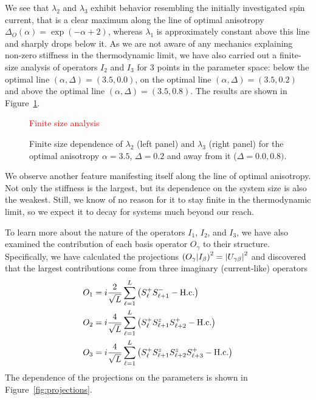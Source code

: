 We see that \(\lambda_2\) and \(\lambda_3\) exhibit behavior resembling the initially investigated spin current,
that is a clear maximum along the line of optimal anisotropy \(\Delta_{O}(\alpha) = \exp(-\alpha + 2)\),
whereas \(\lambda_1\) is approximately constant above this line and sharply drops below it.
As we are not aware of any mechanics explaining non-zero stiffness in the thermodynamic limit, we
have also carried out a finite-size analysis of operators \(I_2\) and \(I_3\) for 3 points in the parameter space:
below the optimal line \((\alpha,\Delta) = (3.5,0.0)\), on the optimal line \((\alpha,\Delta) = (3.5,0.2)\) and
above the optimal line \((\alpha,\Delta) = (3.5,0.8)\). The results are shown in Figure~\ref{fig:stiffness_finite_size}.


\begin{figure}[htbp]
  \centering
  \textcolor{red}{Finite size analysis}
  \caption{Finite size dependence of \(\lambda_2\) (left panel) and \(\lambda_3\) (right panel) for the
  optimal anisotropy \(\alpha = 3.5\), \(\Delta = 0.2\) and away from it (\(\Delta = 0.0,0.8)\).}
  \label{fig:stiffness_finite_size}
\end{figure}
We observe another feature manifesting itself along the line of optimal anisotropy. Not only
the stiffness is the largest, but its dependence on the system size is also the weakest. Still,
we know of no reason for it to stay finite in the thermodynamic limit, so we expect it to
decay for systems much beyond our reach.

To learn more about the nature of the operators \(I_1\), \(I_2\), and \(I_3\), we have also
examined the contribution of each basis operator \(O_{\gamma}\) to their structure. Specifically,
we have calculated the projections \(\left(O_{\gamma} \middle| I_{\beta}\right)^2 = \abs{U_{\gamma\beta}}^2\)
and discovered that the largest contributions come from three imaginary (current-like) operators
\begin{align}
  O_1 &= i \frac{2}{\sqrt{L}} \sum_{\ell=1}^L \left(S^{+}_{\ell} S^{-}_{\ell+1} - \textrm{H.c.}\right)\nonumber\\
  O_2 &= i \frac{4}{\sqrt{L}} \sum_{\ell=1}^L \left(S^{+}_{\ell} S^{z}_{\ell+1} S^{+}_{\ell+2} - \textrm{H.c.}\right)\nonumber\\
  O_3 &= i \frac{4}{\sqrt{L}} \sum_{\ell=1}^L \left(S^{+}_{\ell} S^{z}_{\ell+1} S^{z}_{\ell+2} S^{+}_{\ell+3} - \textrm{H.c.}\right)
  \label{eq:fermionic_currents}
\end{align}
The dependence of the projections on the parameters is shown in Figure~\ref{fig:projections}.

